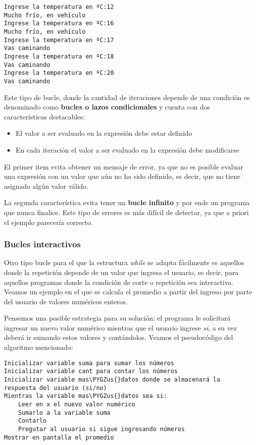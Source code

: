 \documentclass[a4paper,12pt,spanish]{sphinxmanual}
\def\PYGZus{\char`\_}
\begin{document}
\begin{Verbatim}[commandchars=\\\{\}]
Ingrese la temperatura en ºC:12
Mucho frío, en vehículo
Ingrese la temperatura en ºC:16
Mucho frío, en vehículo
Ingrese la temperatura en ºC:17
Vas caminando
Ingrese la temperatura en ºC:18
Vas caminando
Ingrese la temperatura en ºC:20
Vas caminando
\end{Verbatim}

Este tipo de bucle, donde la cantidad de iteraciones depende de una
condición es denominado como \textbf{bucles o lazos condicionales} y cuenta
con dos características destacables:
\begin{itemize}
\item {} 
El valor a ser evaluado en la expresión debe estar definido

\item {} 
En cada iteración el valor a ser evaluado en la expresión debe
modificarse

\end{itemize}

El primer item evita obtener un mensaje de error, ya que no es posible
evaluar una expresión con un valor que aún no ha sido definido, es
decir, que no tiene asignado algún valor válido.

La segunda característica evita tener un \textbf{bucle infinito} y por ende
un programa que nunca finalice. Este tipo de errores es más difícil de
detectar, ya que a priori el ejemplo parecería correcto.


\subsubsection{Bucles interactivos}
\label{Unidad03:bucles-interactivos}
Otro tipo bucle para el que la estructura \emph{while} se adapta fácilmente
es aquellos donde la repetición depende de un valor que ingresa el
usuario, es decir, para aquellos programas donde la condición de corte o
repetición sea interactiva. Veamos un ejemplo en el que se calcula el
promedio a partir del ingreso por parte del usuario de valores numéricos
enteros.

Pensemos una posible estrategia para su solución: el programa le
solicitará ingresar un nuevo valor numérico mientras que el usuario
ingrese \emph{si}, a su vez deberá ir sumando estos valores y contándolos.
Veamos el pseudocódigo del algoritmo mencionado:

\begin{Verbatim}[commandchars=\\\{\}]
Inicializar variable suma para sumar los números
Inicializar variable cant para contar los números
Inicializar variable mas\PYGZus{}datos donde se almacenará la respuesta del usuario (si/no)
Mientras la variable mas\PYGZus{}datos sea si:
    Leer en x el nuevo valor numérico
    Sumarlo a la variable suma
    Contarlo
    Pregutar al usuario si sigue ingresando números
Mostrar en pantalla el promedio
\end{Verbatim}
\end{document}
